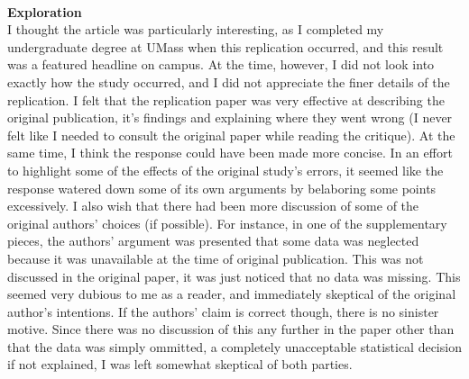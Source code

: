 \documentclass{report}
\newcommand{\tab}{\-\hspace{1cm}}
\begin{document}
\-\\
\textbf{Exploration}\\
\tab I thought the article was particularly interesting, as I completed my undergraduate degree at UMass when this replication occurred, and this result was a featured headline on campus. At the time, however, I did not look into exactly how the study occurred, and I did not appreciate the finer details of the replication. I felt that the replication paper was very effective at describing the original publication, it's findings and explaining where they went wrong (I never felt like I needed to consult the original paper while reading the critique). At the same time, I think the response could have been made more concise. In an effort to highlight some of the effects of the original study's errors, it seemed like the response watered down some of its own arguments by belaboring some points excessively. I also wish that there had been more discussion of some of the original authors' choices (if possible). For instance, in one of the supplementary pieces, the authors' argument was presented that some data was neglected because it was unavailable at the time of original publication. This was not discussed in the original paper, it was just noticed that no data was missing. This seemed very dubious to me as a reader, and immediately skeptical of the original author's intentions. If the authors' claim is correct though, there is no sinister motive. Since there was no discussion of this any further in the paper other than that the data was simply ommitted, a completely unacceptable statistical decision if not explained, I was left somewhat skeptical of both parties. \\


\newpage
\end{document}

